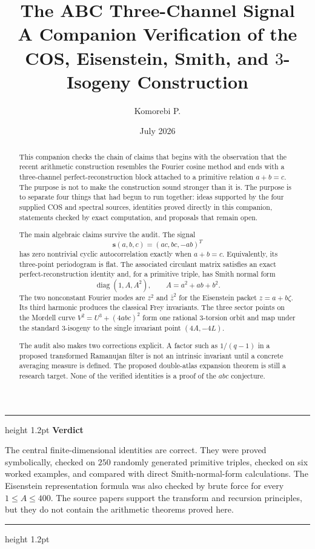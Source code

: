 \documentclass[11pt]{article}
\title{\vspace{-1.5cm}\textbf{The ABC Three-Channel Signal}\\[0.3em]
\Large A Companion Verification of the COS, Eisenstein, Smith, and $3$-Isogeny Construction}
\author{Komorebi P.}
\date{July 2026}
\newenvironment{statusbox}[2]{%
  \par\medskip\noindent
  \begin{minipage}{\textwidth}
  \def\statuscolor{#1}%
  \color{\statuscolor}\hrule height 1.2pt\relax
  \vspace{0.45em}
  {\bfseries #2}\par\smallskip
  \color{Ink}%
}{%
  \par\vspace{0.35em}
  \color{\statuscolor}\hrule height 1.2pt\relax
  \end{minipage}
  \par\medskip
}
\begin{document}
\maketitle

\begin{abstract}
This companion checks the chain of claims that begins with the observation that the recent arithmetic construction resembles the Fourier cosine method and ends with a three-channel perfect-reconstruction block attached to a primitive relation $a+b=c$.  The purpose is not to make the construction sound stronger than it is.  The purpose is to separate four things that had begun to run together: ideas supported by the four supplied COS and spectral sources, identities proved directly in this companion, statements checked by exact computation, and proposals that remain open.

The main algebraic claims survive the audit.  The signal
\[
  \mathbf s(a,b,c)=(ac,bc,-ab)^T
\]
has zero nontrivial cyclic autocorrelation exactly when $a+b=c$.  Equivalently, its three-point periodogram is flat.  The associated circulant matrix satisfies an exact perfect-reconstruction identity and, for a primitive triple, has Smith normal form
\[
  \operatorname{diag}(1,A,A^2),\qquad A=a^2+ab+b^2.
\]
The two nonconstant Fourier modes are $z^2$ and $\bar z^2$ for the Eisenstein packet $z=a+b\zeta$.  Its third harmonic produces the classical Frey invariants.  The three sector points on the Mordell curve $V^2=U^3+(4abc)^2$ form one rational $3$-torsion orbit and map under the standard $3$-isogeny to the single invariant point $(4A,-4L)$.

The audit also makes two corrections explicit.  A factor such as $1/(q-1)$ in a proposed transformed Ramanujan filter is not an intrinsic invariant until a concrete averaging measure is defined.  The proposed double-atlas expansion theorem is still a research target.  None of the verified identities is a proof of the $abc$ conjecture.
\end{abstract}

\begin{statusbox}{Teal}{Verdict}
The central finite-dimensional identities are correct.  They were proved symbolically, checked on $250$ randomly generated primitive triples, checked on six worked examples, and compared with direct Smith-normal-form calculations.  The Eisenstein representation formula was also checked by brute force for every $1\leq A\leq400$.  The source papers support the transform and recursion principles, but they do not contain the arithmetic theorems proved here.
\end{statusbox}
\end{document}

